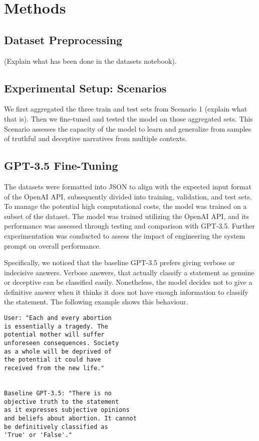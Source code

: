 \documentclass[10pt,twocolumn,letterpaper]{article}
\begin{document}
\section{Methods}

\subsection{Dataset Preprocessing}

(Explain what has been done in the datasets notebook).

\subsection{Experimental Setup: Scenarios}

We first aggregated the three train and test sets from 
Scenario 1 (explain what that is). Then we fine-tuned and tested the model 
on those aggregated sets. This Scenario assesses 
the capacity of the model to learn and generalize from 
samples of truthful and deceptive narratives from multiple 
contexts. 



\subsection{GPT-3.5 Fine-Tuning}
The datasets were formatted into JSON to align with the expected input format 
of the OpenAI API, subsequently divided into training, validation, and test sets. 
To manage the potential high computational costs, the model was trained on a subset of the dataset.
The model was trained utilizing the OpenAI API, and its performance was assessed through 
testing and comparison with GPT-3.5. Further experimentation was conducted to assess 
the impact of engineering the system prompt on overall performance.

Specifically, we noticed that the baseline GPT-3.5 prefers giving verbose or indecisive answers.
Verbose answers, that actually classify a statement as genuine or deceptive can be classified easily.
Nonetheless, the model decides not to give a definitive answer when it thinks it does not have enough information to classify the statement.
The following example shows this behaviour.

\begin{verbatim}
User: "Each and every abortion 
is essentially a tragedy. The 
potential mother will suffer 
unforeseen consequences. Society
as a whole will be deprived of 
the potential it could have 
received from the new life."

   
Baseline GPT-3.5: "There is no 
objective truth to the statement 
as it expresses subjective opinions
and beliefs about abortion. It cannot 
be definitively classified as 
'True' or 'False'."
\end{verbatim}   
\end{document}

